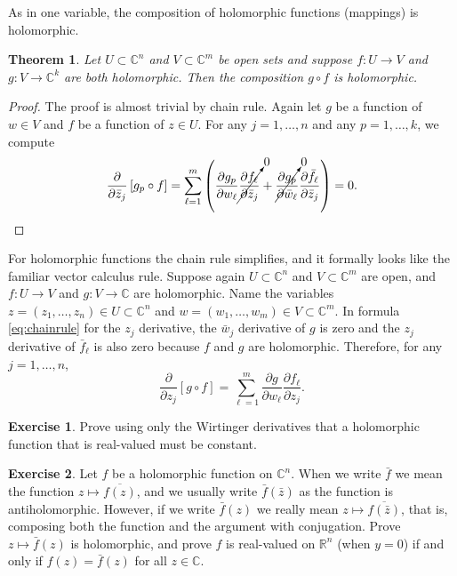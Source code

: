 \documentclass[12pt,openany]{book}
\newcommand{\C}{{\mathbb{C}}}
\newcommand{\R}{{\mathbb{R}}}
\theoremstyle{plain}
\newtheorem{thm}{Theorem}[section]
\theoremstyle{remark}
\theoremstyle{definition}
\newenvironment{exbox}{%
    \def\FrameCommand{\vrule width 1pt \relax\hspace{10pt}}%
    \MakeFramed {\advance \hsize -\width \FrameRestore}%
}{%
    \endMakeFramed
}
\theoremstyle{exercise}
\newtheorem{exercise}{Exercise}[section]
\theoremstyle{example}
\begin{document}
As in one variable, the composition of holomorphic functions (mappings) is
holomorphic.

\begin{thm}
Let $U \subset \C^n$ and $V \subset \C^m$ be open sets and suppose
$f \colon U \to V$ and $g \colon V \to \C^k$ are both holomorphic.
%
Then the composition $g \circ f$ is holomorphic.
\end{thm}

\begin{proof}
The proof is almost trivial by chain rule.
Again let $g$ be a function of $w \in V$ and $f$ be a function of $z \in U$.
For any $j = 1,\ldots,n$ and any $p=1,\ldots,k$, we compute
\begin{equation*}
\frac{\partial}{\partial \bar{z}_j} \left[ g_p \circ f \right]
=
\sum_{\ell=1}^m 
\left(
\frac{\partial g_p}{\partial w_\ell} 
\cancelto{0}{\frac{\partial f_\ell}{\partial \bar{z}_j}}
+
\cancelto{0}{\frac{\partial g_p}{\partial \bar{w}_\ell}}
\frac{\partial \bar{f}_\ell}{\partial \bar{z}_j} 
\right)
=
0 . \qedhere
\end{equation*}
\end{proof}

For holomorphic functions the chain rule simplifies, and it formally looks
like the familiar vector calculus rule.
Suppose again
$U \subset \C^n$ and $V \subset \C^m$ are open, and 
$f \colon U \to V$ and $g \colon V \to \C$ are holomorphic.
Name the variables
$z = (z_1,\ldots,z_n) \in U \subset \C^n$ and $w = (w_1,\ldots,w_m) \in V
\subset \C^m$.  In formula \eqref{eq:chainrule} for the $z_j$ derivative,
the $\bar{w}_j$ derivative of $g$ is zero and the $z_j$ derivative of
$\bar{f}_\ell$ is also zero because $f$ and $g$ are holomorphic.
Therefore, for any $j=1,\ldots,n$,
\begin{equation*}
\frac{\partial}{\partial z_j} \left[ g \circ f \right]
=
\sum_{\ell=1}^m 
\frac{\partial g}{\partial w_\ell}
\frac{\partial f_\ell}{\partial z_j} .
\end{equation*}

\begin{exbox}
\begin{exercise}
Prove using only the Wirtinger derivatives that a holomorphic function
that is real-valued must be constant.
\end{exercise}

\begin{exercise}
Let $f$ be a holomorphic function on $\C^n$.
When we write $\bar{f}$ we mean the function $z \mapsto \overline{f(z)}$,
and we usually write $\bar{f}(\bar{z})$ as the function is antiholomorphic.
However,
if we write $\bar{f}(z)$ we really mean $z \mapsto \overline{f(\bar{z})}$,
that is, composing both the function and the argument with conjugation.
Prove $z \mapsto \bar{f}(z)$ is holomorphic, and prove $f$ is
real-valued on $\R^n$ (when $y=0$) if and only if $f(z) =
\bar{f}(z)$ for all $z \in \C$.
\end{exercise}
\end{exbox}
\end{document}
